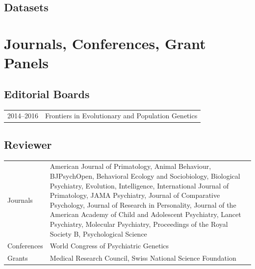 \documentclass[11pt]{article}
\begin{document}
\subsection*{Datasets}

\printbibliography[type=misc,heading=none]

\section*{Journals, Conferences, Grant Panels}

\subsection*{Editorial Boards}

\begin{tabular}{p{3cm}p{12cm}}

2014--2016 & Frontiers in Evolutionary and Population Genetics 

\end{tabular}

\subsection*{Reviewer}

\begin{tabular}{p{3cm}p{12cm}}

Journals & American Journal of Primatology, 
Animal Behaviour,
BJPsychOpen, 
Behavioral Ecology and Sociobiology, 
Biological Psychiatry, 
Evolution, 
Intelligence, 
International Journal of Primatology, 
JAMA Psychiatry, 
Journal of Comparative Psychology, 
Journal of Research in Personality, 
Journal of the American Academy of Child and Adolescent Psychiatry, 
Lancet Psychiatry, 
Molecular Psychiatry, 
Proceedings of the Royal Society B, 
Psychological Science \\

Conferences & World Congress of Psychiatric Genetics \\

Grants & Medical Research Council, Swiss National Science Foundation

\end{tabular}
\end{document}
